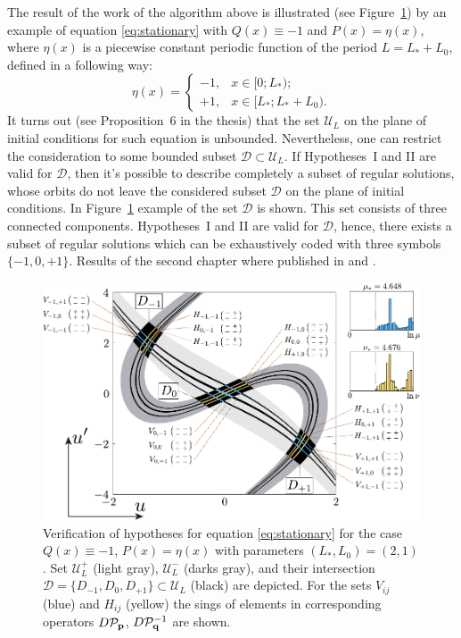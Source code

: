 \documentclass[candidate, href, colorlinks]{disser}
\begin{document}
The result of the work of the algorithm above is illustrated (see Figure~\ref{fig:hypotheses-validation}) by an example of equation \eqref{eq:stationary} with $Q(x) \equiv -1$ and $P(x) = \eta(x)$, where $\eta(x)$ is a piecewise constant periodic function of the period $L = L_* + L_0$, defined in a following way:
\begin{equation}
	\eta(x) = \left\{
		\begin{array}{rl}
			-1, & x \in [0; L_*); \\
			+1, & x \in [L_*; L_* + L_0).
		\end{array}
	\right.
\label{eq:eta}
\end{equation}
It turns out (see Proposition~6 in the thesis) that the set $\mathscr{U}_L$ on the plane of initial conditions for such equation is unbounded.
Nevertheless, one can restrict the consideration to some bounded subset $\mathcal{D} \subset \mathscr{U}_L$.
If Hypotheses~I and II are valid for $\mathcal{D}$, then it's possible to describe completely a subset of regular solutions, whose orbits do not leave the considered subset $\mathcal{D}$ on the plane of initial conditions.
In Figure~\ref{fig:hypotheses-validation} example of the set $\mathcal{D}$ is shown.
This set consists of three connected components.
Hypotheses~I and II are valid for $\mathcal{D}$, hence, there exists a subset of regular solutions which can be exhaustively coded with three symbols $\{-1, 0, +1\}$.
Results of the second chapter where published in \cite{Bannoe2019} and \cite{Bannoe2021}.

\begin{figure}[h]
\centering
	\includegraphics[scale = 1]{../pic/hypotheses for piecewise equation}
	\caption{
		Verification of hypotheses for equation \eqref{eq:stationary} for the case $Q(x) \equiv -1$, $P(x) = \eta(x)$ with parameters $(L_*, L_0) = (2, 1)$.
		Set $\mathscr{U}_L^+$ (light gray), $\mathscr{U}_L^-$ (darks gray), and their intersection $\mathcal{D} = \{ D_{-1}, D_0, D_{+1} \} \subset \mathscr{U}_L$ (black) are depicted.
		For the sets $V_{ij}$ (blue) and $H_{ij}$ (yellow) the sings of elements in corresponding operators $D \mathcal{P}_{\vb{p}}$, $D \mathcal{P}_{\vb{q}}^{-1}$ are shown.
	}
\label{fig:hypotheses-validation}
\end{figure}
\end{document}
